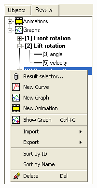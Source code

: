 \hfill\begin{minipage}{0.28\textwidth}
  \includegraphics[width=\textwidth]{Figures/7-RightClickMenuInResultsList}
\end{minipage}

